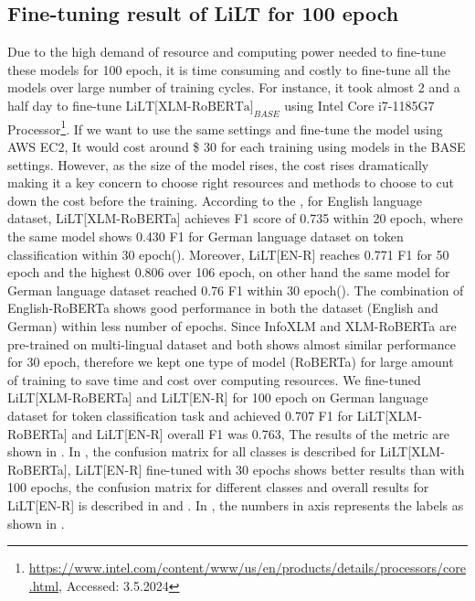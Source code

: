 \subsection{Fine-tuning result of LiLT for 100 epoch}
Due to the high demand of resource and computing power needed to fine-tune these models for 100 epoch, it is time consuming and costly to fine-tune all the models over large number of training cycles. For instance, it took almost 2 and a half day to fine-tune \(\text{LiLT[XLM-RoBERTa]}_{BASE}\) using Intel Core i7-1185G7 Processor\footnote{\url{https://www.intel.com/content/www/us/en/products/details/processors/core.html}, Accessed: 3.5.2024}. If we want to use the same settings and fine-tune the model using AWS EC2, It would cost around \$ 30 for each training using models in the BASE settings. However, as the size of the model rises, the cost rises dramatically making it a key concern to choose right resources and methods to choose to cut down the cost before the training. According to the , for English language dataset, LiLT[XLM-RoBERTa] achieves F1 score of 0.735 within 20 epoch, where the same model shows 0.430 F1 for German language dataset on token classification within 30 epoch(). Moreover, LiLT[EN-R] reaches 0.771 F1 for 50 epoch and the highest 0.806 over 106 epoch, on other hand the same model for German language dataset reached 0.76 F1 within 30 epoch(). The combination of English-RoBERTa shows good performance in both the dataset (English and German) within less number of epochs. Since InfoXLM and XLM-RoBERTa are pre-trained on multi-lingual dataset and both shows almost similar performance for 30 epoch, therefore we kept one type of model (RoBERTa) for large amount of training to save time and cost over computing resources. We fine-tuned LiLT[XLM-RoBERTa] and LiLT[EN-R] for 100 epoch on German language dataset for token classification task and achieved 0.707 F1 for LiLT[XLM-RoBERTa] and LiLT[EN-R] overall F1 was 0.763, The results of the metric are shown in . In , the confusion matrix for all classes is described for LiLT[XLM-RoBERTa],  LiLT[EN-R] fine-tuned with 30 epochs shows better results than with 100 epochs, the confusion matrix for different classes and overall results for LiLT[EN-R] is described in  and . In , the numbers in axis represents the labels as shown in .


